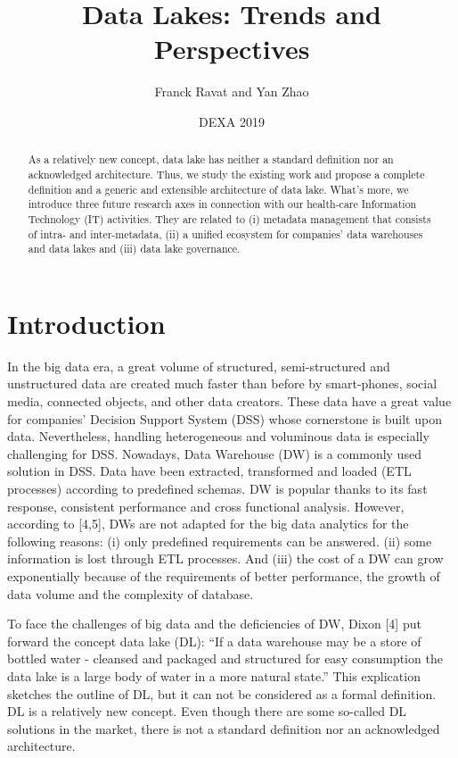 \documentclass[a4paper,12pt,notitlepage,twoside,openright]{article}
\title{Data Lakes: Trends and Perspectives}
\author{Franck Ravat and Yan Zhao}
\date{DEXA 2019}
\begin{document}
\maketitle

\begin{abstract}
As a relatively new concept, data lake has neither a
standard definition nor an acknowledged architecture. Thus, we study the
existing work and propose a complete definition and a generic and
extensible architecture of data lake. What's more, we introduce three
future research axes in connection with our health-care Information
Technology (IT) activities. They are related to (i) metadata management
that consists of intra- and inter-metadata, (ii) a unified ecosystem for
companies' data warehouses and data lakes and (iii) data lake
governance.
\end{abstract}

\hypertarget{introduction}{%
\section{Introduction}\label{introduction}}

In the big data era, a great volume of structured, semi-structured and
unstructured data are created much faster than before by smart-phones,
social media, connected objects, and other data creators. These data
have a great value for companies' Decision Support System (DSS) whose
cornerstone is built upon data. Nevertheless, handling heterogeneous and
voluminous data is especially challenging for DSS. Nowadays, Data
Warehouse (DW) is a commonly used solution in DSS. Data have been
extracted, transformed and loaded (ETL processes) according to
predefined schemas. DW is popular thanks to its fast response,
consistent performance and cross functional analysis. However, according
to {[}4,5{]}, DWs are not adapted for the big data analytics for the
following reasons: (i) only predefined requirements can be answered.
(ii) some information is lost through ETL processes. And (iii) the cost
of a DW can grow exponentially because of the requirements of better
performance, the growth of data volume and the complexity of database.

To face the challenges of big data and the deficiencies of DW, Dixon
{[}4{]} put forward the concept data lake (DL): ``If a data warehouse
may be a store of bottled water - cleansed and packaged and structured
for easy consumption the data lake is a large body of water in a more
natural state.'' This explication sketches the outline of DL, but it can
not be considered as a formal definition. DL is a relatively new
concept. Even though there are some so-called DL solutions in the
market, there is not a standard definition nor an acknowledged
architecture.
\end{document}

